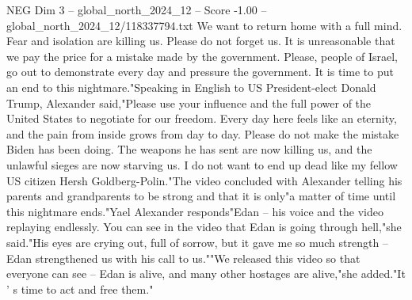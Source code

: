 \begin{textsample}{NEG Dim 3 – global\_north\_2024\_12 – Score -1.00 – global\_north\_2024\_12/118337794.txt}
We want to return home with a full mind.
Fear and isolation are killing us.
Please do not forget us.
It is unreasonable that we pay the price for a mistake made by the government.
Please, people of Israel, go out to demonstrate every day and pressure the government.
It is time to put an end to this nightmare."Speaking in English to US President-elect Donald Trump, Alexander said,"Please use your influence and the full power of the United States to negotiate for our freedom.
Every day here feels like an eternity, and the pain from inside grows from day to day.
Please do not make the mistake Biden has been doing.
The weapons he has sent are now killing us, and the unlawful sieges are now starving us.
I do not want to end up dead like my fellow US citizen Hersh Goldberg-Polin."The video concluded with Alexander telling his parents and grandparents to be strong and that it is only"a matter of time until this nightmare ends."Yael Alexander responds"Edan -- his voice and the video replaying endlessly.
You can see in the video that Edan is going through hell,"she said."His eyes are crying out, full of sorrow, but it gave me so much strength -- Edan strengthened us with his call to us.""We released this video so that everyone can see -- Edan is alive, and many other hostages are alive,"she added."It ' s time to act and free them."

\end{textsample}
